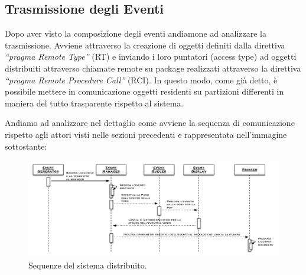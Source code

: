 \documentclass[aps,letterpaper,10pt]{article}
\begin{document}
\subsection{Trasmissione degli Eventi}

Dopo aver visto la composizione degli eventi andiamone ad analizzare la trasmissione. Avviene attraverso la creazione di oggetti definiti dalla direttiva \textit
{``pragma Remote Type''} (RT) e inviando i loro puntatori (access type) ad oggetti distribuiti attraverso chiamate remote su package realizzati attraverso la direttiva \textit{``pragma Remote Procedure Call''} (RCI). In questo modo, come gi\`a detto, \`e possibile mettere in comunicazione oggetti residenti su partizioni differenti in maniera del tutto trasparente rispetto al sistema. \vspace{3mm}

Andiamo ad analizzare nel dettaglio come avviene la sequenza di comunicazione rispetto agli attori visti nelle sezioni precedenti e rappresentata nell'immagine sottostante:

\begin{figure}[H]
	\begin{center}
		\includegraphics[width=480px]{images/dist-sequence.pdf}
	\end{center}
\caption{Sequenze del sistema distribuito.}
\end{figure}
\end{document}
